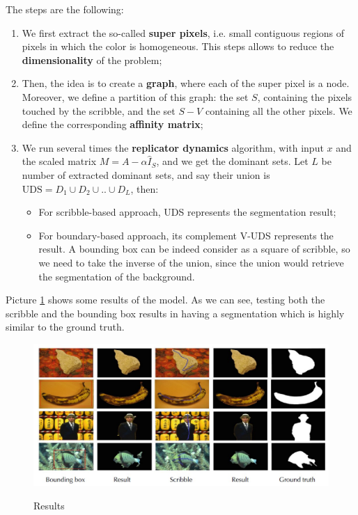 The steps are the following:

\begin{enumerate}
    \item We first extract the so-called \textbf{super pixels}, i.e. small contiguous regions of pixels in which the color is homogeneous. This steps allows to reduce the \textbf{dimensionality} of the problem;
    \item Then, the idea is to create a \textbf{graph}, where each of the super pixel is a node. Moreover, we define a partition of this graph: the set $S$, containing the pixels touched by the scribble, and the set $S-V$ containing all the other pixels. We define the corresponding \textbf{affinity matrix};
    \item We run several times the \textbf{replicator dynamics} algorithm, with input $x$ and the scaled matrix $M = A - \alpha \hat{I}_S$, and we get the dominant sets. Let $L$ be number of extracted dominant sets, and say their union is $\text{UDS} = D_1 \cup D_2 \cup .. \cup D_L$, then:

    \begin{itemize}
        \item For scribble-based approach, UDS represents the segmentation result;
        \item For boundary-based approach, its complement V-UDS represents the result. A bounding box can be indeed consider as a square of scribble, so we need to take the inverse of the union, since the union would retrieve the segmentation of the background.
    \end{itemize}
\end{enumerate}

Picture \ref{iis4} shows some results of the model. As we can see, testing both the scribble and the bounding box results in having a segmentation which is highly similar to the ground truth.

\begin{figure}[h!]
    \centering
    \includegraphics[scale = 1.5]{img/interactive image segmentation4.jpg}
    \label{iis4}
    \caption{Results}
\end{figure}

